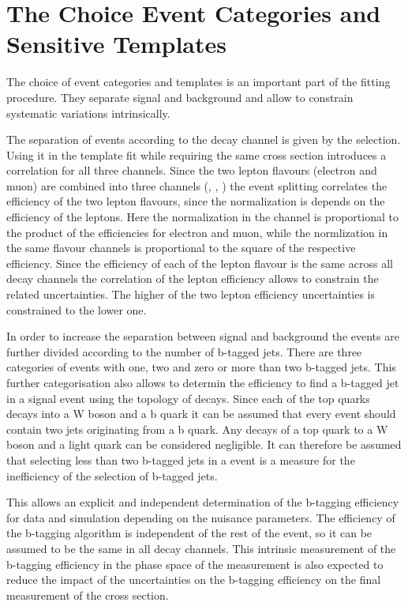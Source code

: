 \section{The Choice Event Categories and Sensitive Templates}
\label{sec:xsec_templates}

The choice of event categories and templates is an important part of the fitting procedure. They separate
 signal and background and allow to constrain systematic variations intrinsically.

The separation of events according to the decay channel is given by the selection. Using it in the template fit while requiring the same cross section introduces a correlation for all three channels.
Since the two lepton flavours (electron and muon) are combined into three channels (\emu, \ee, \mumu) the event splitting correlates the efficiency of the two lepton flavours, since the normalization is depends on the efficiency of the leptons. Here the normalization in the \emu channel is proportional to the product of the efficiencies for electron and muon, while the normlization in the same flavour channels is proportional to the square of the respective efficiency. Since the efficiency of each of the lepton flavour is the same across all decay channels the correlation of the lepton efficiency allows to constrain the related uncertainties. The higher of the two lepton efficiency uncertainties is constrained to the lower one.

In order to increase the separation between signal and background the events are further divided according to the number of b-tagged jets.
There are three categories of events with one, two and zero or more than two b-tagged jets.
This further categorisation also allows to determin the efficiency to find a b-tagged jet in a signal event using the topology of \ttbar decays.
Since each of the top quarks decays into a W boson and a b quark it can be assumed that every \ttbar event should contain two jets originating from a b quark.
Any decays of a top quark to a W boson and a light quark can be considered negligible.
It can therefore be assumed that selecting less than two b-tagged jets in a \ttbar event is a measure for the inefficiency of the selection of b-tagged jets.

This allows an explicit and independent determination of the b-tagging efficiency for data and simulation depending on the nuisance parameters. The efficiency of the b-tagging algorithm is independent of the rest of the event, so it can be assumed to be the same in all \ttbar decay channels.
This intrinsic measurement of the b-tagging efficiency in the phase space of the measurement is also expected to reduce the impact of the uncertainties on the b-tagging efficiency on the final measurement of the \ttbar cross section.

